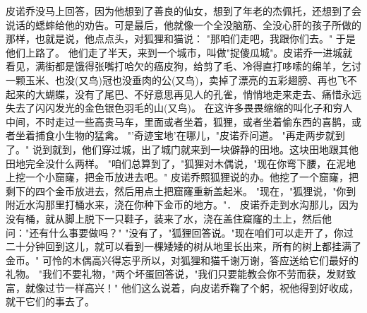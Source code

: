 \documentclass[12pt,UTF8]{ctexbook}
\begin{document}
皮诺乔没马上回答，因为他想到了善良的仙女，想到了年老的杰佩托，还想到了会说话的蟋蟀给他的劝告。可是最后，他就像一个全没脑筋、全没心肝的孩子所做的那样，也就是说，他点点头，对狐狸和猫说：
"那咱们走吧，我跟你们去。"
于是他们上路了。
他们走了半天，来到一个城市，叫做"捉傻瓜城"。皮诺乔一进城就看见，满街都是饿得张嘴打哈欠的癌皮狗，给剪了毛、冷得直打哆嗦的绵羊，乞讨一颗玉米、也没(又鸟)冠也没垂肉的公(又鸟)，卖掉了漂亮的五彩翅膀、再也飞不起来的大蝴蝶，没有了尾巴、不好意思再见人的孔雀，悄悄地走来走去、痛惜永远失去了闪闪发光的金色银色羽毛的山(又鸟)。
在这许多畏畏缩缩的叫化子和穷人中间，不时走过一些高贵马车，里面或者坐着，狐狸，或者坐着偷东西的喜鹊，或者坐着捕食小生物的猛禽。
"'奇迹宝地'在哪儿，"皮诺乔问道。
"再走两步就到了。"
说到就到，他们穿过城，出了城门就来到一块僻静的田地。这块田地跟其他田地完全没什么两样。
"咱们总算到了，"狐狸对木偶说，"现在你弯下腰，在泥地上挖一个小窟窿，把金币放进去吧。"
皮诺乔照狐狸说的办。他挖了一个窟窿，把剩下的四个金币放进去，然后用点土把窟窿重新盖起米。
"现在，"狐狸说，"你到附近水沟那里打桶水来，浇在你种下金币的地方。"．
皮诺乔走到水沟那儿，因为没有桶，就从脚上脱下一只鞋子，装来了水，浇在盖住窟窿的土上，然后他问："还有什么事要做吗？"
"没有了，"狐狸回答说。"现在咱们可以走开了，你过二十分钟回到这儿，就可以看到一棵矮矮的树从地里长出来，所有的树上都挂满了金币。"
可怜的木偶高兴得忘乎所以，对狐狸和猫千谢万谢，答应送给它们最好的礼物。
"我们不要礼物，"两个坏蛋回答说，"我们只要能教会你不劳而获，发财致富，就像过节一样高兴！"
他们这么说着，向皮诺乔鞠了个躬，祝他得到好收成，就干它们的事去了。

\chapter{}
\end{document}
